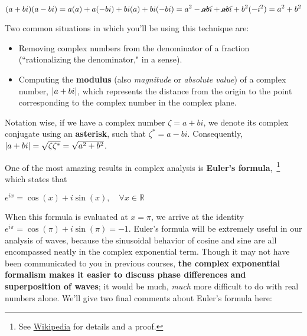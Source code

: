 \begin{equation*} 
	(a+bi)(a-bi) = a(a) + a(-bi) + bi(a) + bi(-bi) = a^2 - \cancel{abi} + \cancel{abi} + b^2(-i^2) = a^2+b^2
\end{equation*}

Two common situations in which you'll be using this technique are:

\begin{itemize}
	\item Removing complex numbers from the denominator of a fraction (``rationalizing the denominator," in a sense).
	
	\item Computing the \textbf{modulus} (also \emph{magnitude} or \emph{absolute value}) of a complex number, $\abs{a + bi}$, which represents the distance from the origin to the point corresponding to the complex number in the complex plane.
\end{itemize}

Notation wise, if we have a complex number $\zeta = a + bi$, we denote its complex conjugate using an \textbf{asterisk}, such that $\zeta^* = a - bi$.
Consequently, $\abs{a + bi} = \sqrt{\zeta \zeta^*} = \sqrt{a^2 + b^2}$.

One of the most amazing results in complex analysis is \textbf{Euler's formula},~\footnote{See \href{https://en.wikipedia.org/wiki/Euler\%27s\_formula}{Wikipedia} for details and a proof.} which states that 

\begin{tcolorbox}[title=Euler's formula]
	$e^{ix} = \cos(x) + i\sin(x), \quad \forall x \in \mathbb{R}$
\end{tcolorbox}

When this formula is evaluated at $x=\pi$, we arrive at the identity $e^{i\pi} = \cos(\pi) + i\sin(\pi) = -1$. 
Euler's formula will be extremely useful in our analysis of waves, because the sinusoidal behavior of cosine and sine are all encompassed neatly in the complex exponential term. 
Though it may not have been communicated to you in previous courses, \textbf{the complex exponential formalism makes it easier to discuss phase differences and superposition of waves}; it would be much, \emph{much} more difficult to do with real numbers alone.
We'll give two final comments about Euler's formula here:

